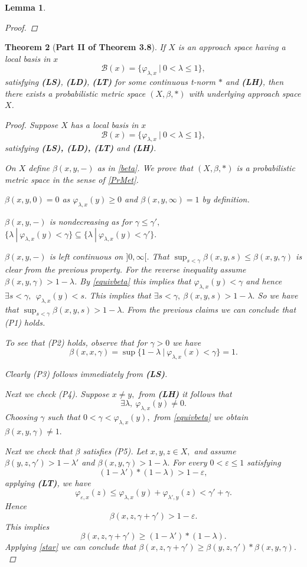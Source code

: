 \documentclass[12pt,a4paper]{amsart}
\theoremstyle{theorem}
\newtheorem{theorem}{Theorem}[section]
\newtheorem{lemma}[theorem]{Lemma}
\theoremstyle{definition}
\newcommand{\bbb}{\ensuremath{\mathcal{B}}}
\renewcommand{\b}{\ensuremath{\beta}}
\newcommand{\ve}{\ensuremath{\varepsilon}}
\renewcommand{\l}{\ensuremath{\lambda}}
\begin{document}
{\begin{lemma}
\begin{proof}
\end{proof}
\end{lemma}


\begin{theorem} [\bf Part II of Theorem 3.8]\label{pmetr}
If $X$ is an approach space having a local basis in $x$
$$
\bbb(x) = \{ \varphi_{\l,x} \ | \ 0  < \l \leq 1 \},
$$
satisfying {\bf(LS)}, {\bf(LD)}, {\bf(LT)} for some continuous t-norm $*$ and {\bf(LH)}, then there exists a probabilistic metric space $(X,\b,*)$ with underlying approach space $X$.

\begin{proof}
Suppose 
$X$ has a local basis in $x$ 
$$
\bbb(x) = \{ \varphi_{\l,x} \ | \ 0  < \l \leq 1 \},
$$
satisfying {\bf(LS), (LD), (LT)} and {\bf(LH)}.

On $X$ define $\b(x,y, -)$ as in \eqref{beta}.
We prove that $(X, \b, *) $ is a probabilistic metric space in the sense of \eqref{PrMet}.

$\b(x,y,0) =0$ as $\varphi_{\l,x} (y) \geq 0$ and $\b(x,y,\infty) =1$ by definition.

$\b(x,y,-)$ is nondecreasing as for $\gamma \leq \gamma',$  $\{ \l \ | \ \varphi_{\l,x} (y) < \gamma\} \subseteq \{ \l \ | \ \varphi_{\l,x} (y) < \gamma'\}.$


$\b(x,y,-)$ is left continuous on $]0, \infty[$. That $\sup_{s < \gamma} \b(x,y,s) \leq  \b(x,y,\gamma)$ is clear from the previous property. For the reverse inequality assume $\b(x,y,\gamma) > 1 - \l$. By \ref{equivbeta} this implies that $\varphi _{ \l,x} (y) < \gamma$  and hence $\exists s < \gamma,  \ \ \varphi _{ \l,x} (y) < s.$ This implies that $\exists s <\gamma,  \  \b(x,y,s) > 1 - \l.$ So we have that $\sup_{s < \gamma} \b(x,y,s) > 1 - \l.$
From the previous claims we can conclude that (P1) holds.

To see that (P2) holds,  observe that for $\gamma >0$  we have\\
 $$\b(x,x,\gamma) = \sup \{1 - \l \ | \ \varphi_{\l,x} (x) < \gamma\}  = 1.$$

Clearly (P3) follows immediately from {\bf(LS)}.

Next we check (P4). Suppose $x \not = y,$  from {\bf (LH)} it follows that $$\exists \l, \ \varphi_{\l,x} (y) \not = 0.$$
Choosing $\gamma$ such that $0 < \gamma < \varphi_{\l,x} (y), $ from \ref{equivbeta} we obtain $\b(x,y,\gamma) \not = 1.$

Next we check that $\b$ satisfies (P5). Let $x,y,z \in X,$ and assume $\b(y,z,\gamma') > 1 - \l'$ and $\b(x,y,\gamma) > 1 - \l.$  
For every $ 0 < \ve \leq 1 $ satisfying 
$$
(1 - \l') * ( 1 - \l) > 1-\ve,
$$
applying {\bf(LT)},  
we have
$$
\varphi_{\ve,x} (z) \leq \varphi _{\l, x} (y) + \varphi _{\l', y} (z) < \gamma' + \gamma.
$$
Hence
$$
\b(x,z, \gamma + \gamma') > 1 - \ve. 
$$
This implies
$$
\b(x,z, \gamma + \gamma') \geq  (1 - \l') * ( 1 - \l).
$$
Applying \ref{star}
we can conclude that $\b(x,z, \gamma + \gamma') \geq \b(y,z, \gamma')  * \b(x,y, \gamma). $\\


\end{proof}
\end{theorem}}
\end{document}
